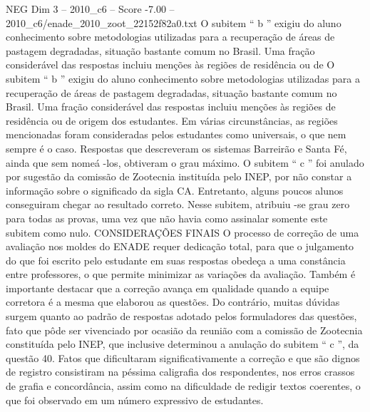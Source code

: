 \begin{textsample}{NEG Dim 3 – 2010\_c6 – Score -7.00 – 2010\_c6/enade\_2010\_zoot\_22152f82a0.txt}
O subitem “ b ” exigiu do aluno conhecimento sobre metodologias utilizadas para a recuperação de áreas de pastagem degradadas, situação bastante comum no Brasil.
Uma fração considerável das respostas incluiu menções às regiões de residência ou de O subitem “ b ” exigiu do aluno conhecimento sobre metodologias utilizadas para a recuperação de áreas de pastagem degradadas, situação bastante comum no Brasil.
Uma fração considerável das respostas incluiu menções às regiões de residência ou de origem dos estudantes.
Em várias circunstâncias, as regiões mencionadas foram consideradas pelos estudantes como universais, o que nem sempre é o caso.
Respostas que descreveram os sistemas Barreirão e Santa Fé, ainda que sem nomeá -los, obtiveram o grau máximo.
O subitem “ c ” foi anulado por sugestão da comissão de Zootecnia instituída pelo INEP, por não constar a informação sobre o significado da sigla CA.
Entretanto, alguns poucos alunos conseguiram chegar ao resultado correto.
Nesse subitem, atribuiu -se grau zero para todas as provas, uma vez que não havia como assinalar somente este subitem como nulo.
CONSIDERAÇÕES FINAIS O processo de correção de uma avaliação nos moldes do ENADE requer dedicação total, para que o julgamento do que foi escrito pelo estudante em suas respostas obedeça a uma constância entre professores, o que permite minimizar as variações da avaliação.
Também é importante destacar que a correção avança em qualidade quando a equipe corretora é a mesma que elaborou as questões.
Do contrário, muitas dúvidas surgem quanto ao padrão de respostas adotado pelos formuladores das questões, fato que pôde ser vivenciado por ocasião da reunião com a comissão de Zootecnia constituída pelo INEP, que inclusive determinou a anulação do subitem “ c ”, da questão 40.
Fatos que dificultaram significativamente a correção e que são dignos de registro consistiram na péssima caligrafia dos respondentes, nos erros crassos de grafia e concordância, assim como na dificuldade de redigir textos coerentes, o que foi observado em um número expressivo de estudantes.

\end{textsample}
